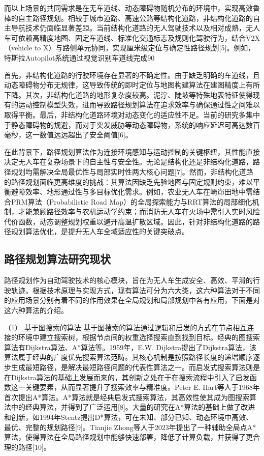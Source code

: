 \documentclass[lettersize,journal]{IEEEtran}
\begin{document}
而以上场景的共同需求是在无车道线、动态障碍物随机分布的环境中，实现高效鲁棒的自主路径规划。相较于城市道路、高速公路等结构化道路，非结构化道路的自主导航技术仍面临显著差距。当前结构化道路的无人驾驶技术以及相对成熟，无人车可依赖高精度地图、固定车道线、标准化交通标志及规则化驾驶行为，结合V2X（vehicle to X）与路侧单元协同，实现厘米级定位与确定性路径规划[5]。例如，特斯拉Autopilot系统通过视觉识别车道线完成90%

首先，非结构化道路的行驶环境存在显著的不确定性。由于缺乏明确的车道线，且动态障碍物分布无规律，这导致传统的即时定位与地图构建算法在建图精度上有所下降。其次，非结构化道路的地形复杂度较高。泥泞、陡坡等特殊地表特征使得现有的运动控制模型失效，进而导致路径规划算法在追求效率与确保通过性之间难以取得平衡。最后，非结构化道路环境对动态变化的适应性不足。当前的研究多集中于静态障碍物的规避，而对于突发威胁等动态障碍物，系统的响应延迟可高达数百毫秒，这一数值远远超出了安全阈值[6]。

在此背景下，路径规划算法作为连接环境感知与运动控制的关键枢纽，其性能直接决定无人车在复杂场景下的自主性与安全性。无论是结构化还是非结构化道路，路径规划均需解决全局最优性与局部实时性两大核心问题[7]。然而，非结构化道路的路径规划面临更高维度的挑战：其算法因缺乏先验地图与固定规则约束，难以平衡避障效率、地形通过性与多目标优化需求。例如，农业无人车在崎岇田地中需结合PRM算法（Probabilistic Road Map）的全局探索能力与RRT算法的局部细化机制，才能兼顾路径效率与农机运动学约束；而消防无人车在火场中需引入实时风险代价函数，动态调整规划权重以避开高温扩散区域。因此，针对非结构化道路的路径规划算法优化，是提升无人车全域适应性的关键突破点。

\subsection{路径规划算法研究现状}


路径规划作为自动驾驶技术的核心模块，旨在为无人车生成安全、高效、平滑的行驶轨迹。根据技术原理与实现方式，现有算法可分为六大类，这六种算法对于不同的应用场景分别有着不同的作用效果在全局规划和局部规划中各有应用，下面是对这六种算法的介绍。

（1）	基于图搜索的算法
基于图搜索的算法通过逻辑和启发的方式在节点相互连接的环境中建立搜索树，根据节点间的权重选择搜索直到找到目标。经典的图搜索算法有Dijkstra算法、A*算法等。1959年，E.W. Dijkstra提出了Dijkstra算法，该算法属于经典的广度优先搜索算法范畴。其核心机制是按照路径长度的递增顺序逐步生成最短路径，是解决最短路径问题的代表性算法之一。而启发式搜索算法则是在Dijkstra算法的基础上发展而来的，其创新之处在于在搜索流程中引入了启发函数这一关键要素，从而显著提升了搜索效率与精准度。Peter E. Hart等人于1968年首次提出A*算法。A*算法就是经典启发式搜索算法，其高效性使其成为图搜索算法中的经典算法，并得到了广泛运用[8]。大量的研究在A*算法的基础上做了改进和创新，如1994年Stentz提出D*算法，可在未知、部分已知、动态环境中高效、最优、完整的规划路径[9]。Tianjie Zhong等人于2023年提出了一种辅助全局点A*算法，使得算法在全局路径规划中能够快速部署，降低了计算负载，并获得了更合理的路径[10]。
\end{document}

